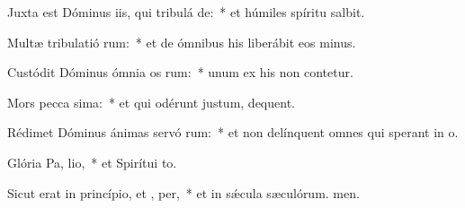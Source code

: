 \item Juxta est Dóminus iis, qui tribulá  de:~* et húmiles spíritu salbit.
\item Multæ tribulatió rum:~* et de ómnibus his liberábit eos minus.
\item Custódit Dóminus ómnia os rum:~* unum ex his non contetur.
\item Mors pecca sima:~* et qui odérunt justum, dequent.
\item Rédimet Dóminus ánimas servó rum:~* et non delínquent omnes qui sperant in o.
\item Glória Pa,  lio,~* et Spirítui to.
\item Sicut erat in princípio, et ,  per,~* et in sǽcula sæculórum. men.
